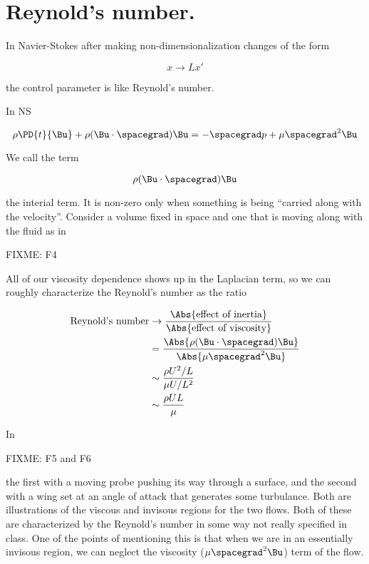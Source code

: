 \section{Reynold's number.}

In Navier-Stokes after making non-dimensionalization changes of the form

\begin{equation}\label{eqn:inclinedFlowWithoutConstantHeightAssumption:150}
x \rightarrow L x'
\end{equation}

the control parameter is like Reynold's number.

In NS

\begin{equation}\label{eqn:inclinedFlowWithoutConstantHeightAssumption:170}
\rho \PD{t}{\Bu} + \rho ( \Bu \cdot \spacegrad ) \Bu = - \spacegrad p + \mu \spacegrad^2 \Bu
\end{equation}

We call the term

\begin{equation}\label{eqn:inclinedFlowWithoutConstantHeightAssumption:190}
\rho ( \Bu \cdot \spacegrad ) \Bu
\end{equation}

the interial term.  It is non-zero only when something is being ``carried along with the velocity''.  Consider a volume fixed in space and one that is moving along with the fluid as in

FIXME: F4

All of our viscosity dependence shows up in the Laplacian term, so we can roughly characterize the Reynold's number as the ratio

\begin{align*}
\text{Reynold's number}
&\rightarrow
\frac{\Abs{\text{effect of inertia}}}{\Abs{\text{effect of viscosity}}}  \\
&=
\frac{ \Abs{\rho ( \Bu \cdot \spacegrad ) \Bu } }{\Abs{ \mu \spacegrad^2 \Bu}} \\
&\sim
\frac{ \rho U^2/L }{\mu U/L^2} \\
&\sim
\frac{ \rho U L }{\mu }
\end{align*}

In 

FIXME: F5 and F6

the first with a moving probe pushing its way through a surface, and the second with a wing set at an angle of attack that generates some turbulance.  Both are illustrations of the viscous and invisous regions for the two flows.  Both of these are characterized by the Reynold's number in some way not really specified in class.  One of the points of mentioning this is that when we are in an essentially invisous region, we can neglect the viscosity ($\mu \spacegrad^2 \Bu$) term of the flow.


\EndArticle
